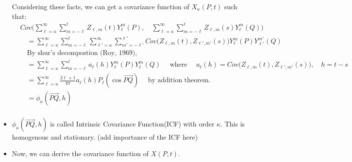 \documentclass[11pt]{article}
\begin{document}
\begin{itemize}
Considering these facts, we can get a covariance function of $X_\kappa(P,t)$ such that:\\
\begin{align*}
&Cov\biggl(\sum_{\ell=\kappa}^{\infty} \sum_{m=-\ell}^{\ell} Z_{\ell,m}(t) Y_{\ell}^{m}(P),\quad \sum_{\ell=\kappa}^{\infty} \sum_{m=-\ell}^{\ell} Z_{\ell,m}(s) Y_{\ell}^{m}(Q)\biggl)\\
&\quad = \sum_{\ell=\kappa}^{\infty} \sum_{m=-\ell}^{\ell} \sum_{\ell'=\kappa}^{\infty} \sum_{m'=-\ell'}^{\ell'} Cov\biggl( Z_{\ell,m}(t), Z_{\ell',m'}(s) \biggl) Y_{\ell}^{m}(P) Y_{\ell'}^{m'}(Q)\\
&\quad \text{By shur's decompostion (Roy, 1969), }\\
&\quad = \sum_{\ell=\kappa}^{\infty} \sum_{m=-\ell}^{\ell} a_\ell(h) Y_{\ell}^{m}(P) Y_{\ell}^{m}(Q) \quad \text{ where } \quad a_\ell(h)=Cov\biggl( Z_{\ell,m}(t), Z_{\ell',m'}(s) \biggl), \quad h=t-s\\
&\quad = \sum_{\ell=\kappa}^\infty \frac{2\ell+1}{4\pi} a_\ell(h) P_\ell(\cos\overrightarrow{PQ}) \quad \text{ by addition theorem.}\\
&\quad = \phi_\kappa(\overrightarrow{PQ},h)\\
\end{align*}

\item
$\phi_\kappa(\overrightarrow{PQ},h)$ is called Intrinsic Covariance Function(ICF) with order $\kappa$. This is homogenous and stationary. {\color{red} (add importance of the ICF here) }\\

\item Now, we can derive the covariance function of $X(P,t)$.\\



\end{itemize}
\end{document}
